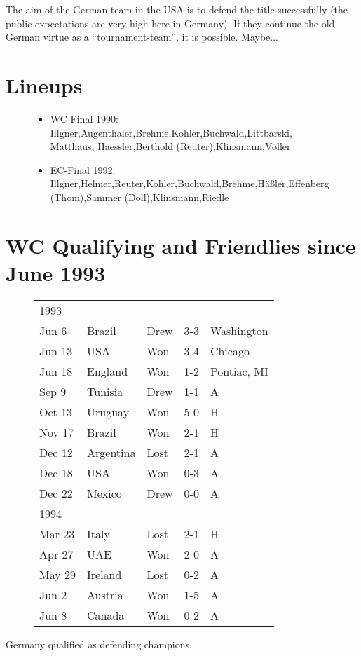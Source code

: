 The aim of the German team in the USA is to defend the title successfully 
(the public expectations are very high here in Germany). If they continue the 
old German virtue as a ``tournament-team'', it is possible. Maybe...
\section{Lineups}
\begin{figure}[H]
\begin{itemize}
\item WC Final 1990: Illgner,Augenthaler,Brehme,Kohler,Buchwald,Littbarski, Matth{\"a}us, Haessler,Berthold (Reuter),Klinsmann,V{\"o}ller   
\item EC-Final 1992: Illgner,Helmer,Reuter,Kohler,Buchwald,Brehme,H{\"a}{\ss}ler,Effenberg (Thom),Sammer (Doll),Klinsmann,Riedle
\end{itemize}
\end{figure}
\section{WC Qualifying and Friendlies since June 1993}
\begin{figure}[H]
\begin{tabular}{l l l c l}
1993 & & & & \\
Jun 6 & Brazil & Drew & 3-3 & Washington \\
Jun 13 & USA & Won & 3-4 & Chicago \\
Jun 18 & England & Won & 1-2 & Pontiac, MI \\
Sep 9 & Tunisia & Drew & 1-1 & A \\
Oct 13 & Uruguay & Won & 5-0 & H \\
Nov 17 & Brazil & Won & 2-1 & H \\
Dec 12 & Argentina & Lost & 2-1 & A \\
Dec 18 & USA & Won & 0-3 & A \\
Dec 22 & Mexico & Drew & 0-0 & A \\
1994 & & & & \\
Mar 23 & Italy & Lost & 2-1 & H \\
Apr 27 & UAE & Won & 2-0 & A \\
May 29 & Ireland & Lost & 0-2 & A \\
Jun 2 & Austria & Won & 1-5 & A \\
Jun 8 & Canada & Won & 0-2 & A \\
\end{tabular}
\end{figure}
Germany qualified as defending champions.
